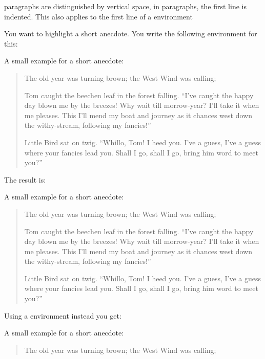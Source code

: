      paragraphs are distinguished by vertical space, in
     paragraphs, the first line is indented. This also
    applies to the first line of a 
    environment%
  \fi %
    \begin{Example}
      You want to highlight a short anecdote. You write the following
       environment for this:%
\begin{lstcode}
  A small example for a short anecdote:
  \begin{quotation}
    The old year was turning brown; the West Wind was
    calling;
        
    Tom caught the beechen leaf in the forest falling.
    ``I've caught the happy day blown me by the breezes!
    Why wait till morrow-year? I'll take it when me pleases.
    This I'll mend my boat and journey as it chances
    west down the withy-stream, following my fancies!''
    
    Little Bird sat on twig. ``Whillo, Tom! I heed you.
    I've a guess, I've a guess where your fancies lead you.
    Shall I go, shall I go, bring him word to meet you?''
  \end{quotation}
\end{lstcode}
      The result is:
      \begin{ShowOutput}
        A small example for a short anecdote:
        \begin{quotation}
          The old year was turning brown; the West Wind was
          calling;

          Tom caught the beechen leaf in the forest falling.
          ``I've caught the happy day blown me by the breezes!
          Why wait till morrow-year? I'll take it when me pleases.
          This I'll mend my boat and journey as it chances
          west down the withy-stream, following my fancies!''

          Little Bird sat on twig. ``Whillo, Tom! I heed you.
          I've a guess, I've a guess where your fancies lead you.
          Shall I go, shall I go, bring him word to meet you?''
        \end{quotation}
      \end{ShowOutput}
      Using a  environment instead you get:
      \begin{ShowOutput}
        A small example for a short anecdote:
        \begin{quote}\setlength{\parskip}{4pt plus 2pt minus 2pt}
          The old year was turning brown; the West Wind was
          calling;


\end{quote}
\end{ShowOutput}
\end{Example}
